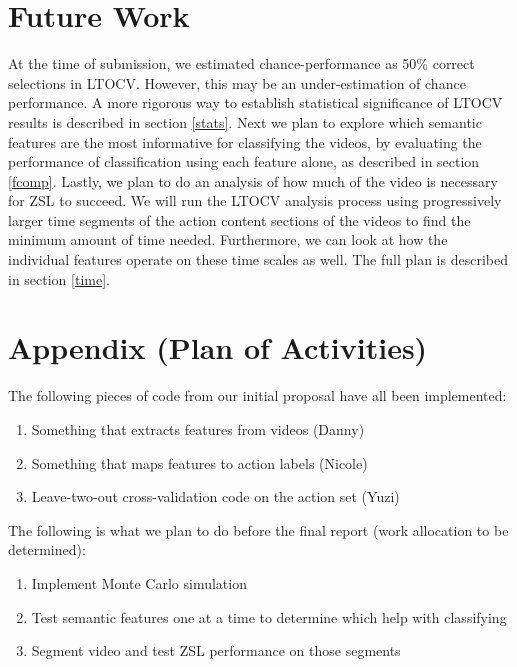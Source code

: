 \documentclass{article}
\begin{document}
\section{Future Work} %
At the time of submission, we estimated chance-performance as 50\% correct selections in LTOCV.  However, this may be an under-estimation of chance performance. A more rigorous way to establish statistical significance of LTOCV results is described in section \ref{stats}. 
Next we plan to explore which semantic features are the most informative for classifying the videos, by evaluating the performance of classification using each feature alone, as described in section \ref{fcomp}.
Lastly, we plan to do an analysis of how much of the video is necessary for ZSL to succeed. We will run the LTOCV analysis process using progressively larger time segments of the action content sections of the videos to find the minimum amount of time needed. Furthermore, we can look at how the individual features operate on these time scales as well. The full plan is described in section \ref{time}.

\section*{Appendix (Plan of Activities)}
The following pieces of code from our initial proposal have all been implemented:
\begin{enumerate}
\item Something that extracts features from videos (Danny)
\item Something that maps features to action labels (Nicole)
\item Leave-two-out cross-validation code on the action set (Yuzi)
\end{enumerate}
The following is what we plan to do before the final report (work allocation to be determined):
\begin{enumerate}
\item Implement Monte Carlo simulation
\item Test semantic features one at a time to determine which help with classifying
\item Segment video and test ZSL performance on those segments
\end{enumerate}



\end{document}
